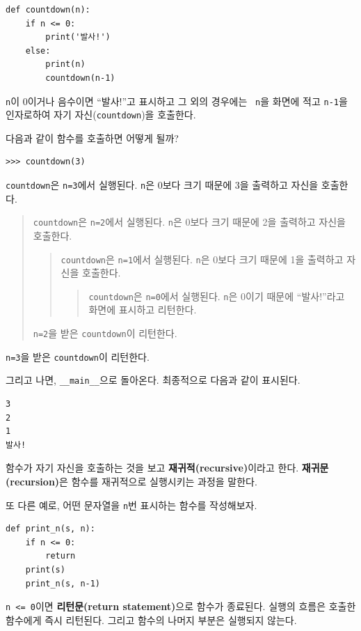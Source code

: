 \documentclass[10pt]{book}
\begin{document}
\begin{verbatim}
def countdown(n):
    if n <= 0:
        print('발사!')
    else:
        print(n)
        countdown(n-1)
\end{verbatim}
%
{\tt n}이 0이거나 음수이면 ``발사!''고 표시하고 그 외의 경우에는 {\tt
  n}을 화면에 적고 {\tt n-1}을 인자로하여 자기 자신({\tt countdown})을
호출한다.

다음과 같이 함수를 호출하면 어떻게 될까? 

\begin{verbatim}
>>> countdown(3)
\end{verbatim}
%
{\tt countdown}은 {\tt n=3}에서 실행된다.  {\tt n}은 0보다 크기 때문에
3을 출력하고 자신을 호출한다.


\begin{quote}
{\tt countdown}은 {\tt n=2}에서 실행된다.  {\tt n}은 0보다 크기 때문에
2을 출력하고 자신을 호출한다.


\begin{quote}
{\tt countdown}은 {\tt n=1}에서 실행된다.  {\tt n}은 0보다 크기 때문에
1을 출력하고 자신을 호출한다.


\begin{quote} 
{\tt countdown}은 {\tt n=0}에서 실행된다.  {\tt n}은
  0이기 때문에 ``발사!''라고 화면에 표시하고 리턴한다.
\end{quote}

\end{quote}

{\tt n=2}을 받은 {\tt countdown}이 리턴한다.
\end{quote}

{\tt n=3}을 받은 {\tt countdown}이 리턴한다.

그리고 나면, \verb"__main__"으로 돌아온다.  최종적으로 다음과 같이
표시된다.  

\begin{verbatim}
3
2
1
발사!
\end{verbatim}
%
함수가 자기 자신을 호출하는 것을 보고 {\bf 재귀적(recursive)}이라고
한다.  {\bf 재귀문(recursion)}은 함수를 재귀적으로 실행시키는 과정을
말한다.

또 다른 예로, 어떤 문자열을 {\tt n}번 표시하는 함수를 작성해보자.

\begin{verbatim}
def print_n(s, n):
    if n <= 0:
        return
    print(s)
    print_n(s, n-1)
\end{verbatim}
%
{\tt n <= 0}이면 {\bf 리턴문(return statement)}으로 함수가 종료된다.
실행의 흐름은 호출한 함수에게 즉시 리턴된다. 그리고 함수의 나머지
부분은 실행되지 않는다.
\end{document}
